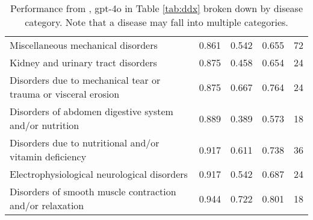 \begin{table*}
\begin{tabular}{p{}p{}p{}p{}p{}}
        Miscellaneous mechanical disorders & \cellcolor{blue!50}0.861 & \cellcolor{blue!34}0.542 & \cellcolor{blue!36}0.655 & \cellcolor{blue!24}72 \\
        Kidney and urinary tract disorders & \cellcolor{blue!50}0.875 & \cellcolor{blue!35}0.458 & \cellcolor{blue!36}0.654 & \cellcolor{blue!0}24 \\
        Disorders due to mechanical tear or trauma or visceral erosion & \cellcolor{blue!50}0.875 & \cellcolor{blue!50}0.667 & \cellcolor{blue!50}0.764 & \cellcolor{blue!0}24 \\
        Disorders of abdomen digestive system and/or nutrition & \cellcolor{blue!50}0.889 & \cellcolor{blue!24}0.389 & \cellcolor{blue!38}0.573 & \cellcolor{blue!0}18 \\
        Disorders due to nutritional and/or vitamin deficiency & \cellcolor{blue!50}0.917 & \cellcolor{blue!43}0.611 & \cellcolor{blue!50}0.738 & \cellcolor{blue!7}36 \\
        Electrophysiological neurological disorders & \cellcolor{blue!50}0.917 & \cellcolor{blue!34}0.542 & \cellcolor{blue!42}0.687 & \cellcolor{blue!0}24 \\
        Disorders of smooth muscle contraction and/or relaxation & \cellcolor{blue!50}0.944 & \cellcolor{blue!50}0.722 & \cellcolor{blue!50}0.801 & \cellcolor{blue!0}18 \\
        \bottomrule
\end{tabular}
\caption{Performance from \methodname, gpt-4o in Table \ref{tab:ddx} broken down by disease category. Note that a disease may fall into multiple categories.}
\label{tab:ddx_by_cat}
\end{table*}

